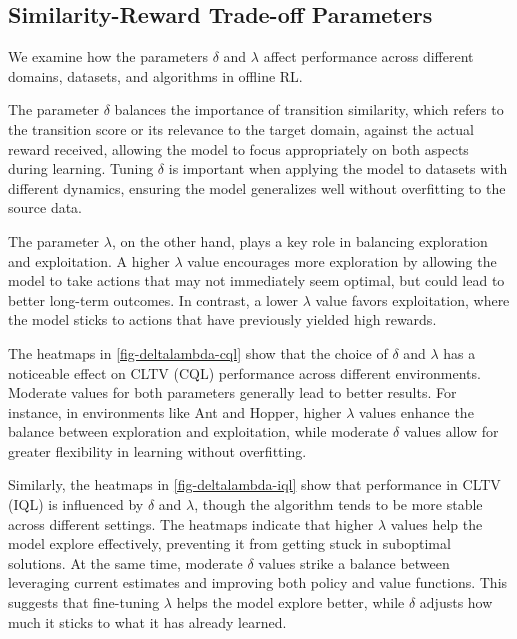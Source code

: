 \subsection{Similarity-Reward Trade-off Parameters}
\label{par-impact}
We examine how the parameters \(\delta\) and \(\lambda\) affect performance across different domains, datasets, and algorithms in offline RL.

The parameter \(\delta\) balances the importance of transition similarity, which refers to the transition score or its relevance to the target domain, against the actual reward received, allowing the model to focus appropriately on both aspects during learning. Tuning \(\delta\) is important when applying the model to datasets with different dynamics, ensuring the model generalizes well without overfitting to the source data. 

The parameter \(\lambda\), on the other hand, plays a key role in balancing exploration and exploitation. A higher \(\lambda\) value encourages more exploration by allowing the model to take actions that may not immediately seem optimal, but could lead to better long-term outcomes. In contrast, a lower \(\lambda\) value favors exploitation, where the model sticks to actions that have previously yielded high rewards.

The heatmaps in \autoref{fig-deltalambda-cql} show that the choice of \(\delta\) and \(\lambda\) has a noticeable effect on CLTV (CQL) performance across different environments. Moderate values for both parameters generally lead to better results. For instance, in environments like Ant and Hopper, higher \(\lambda\) values enhance the balance between exploration and exploitation, while moderate \(\delta\) values allow for greater flexibility in learning without overfitting.

Similarly, the heatmaps in \autoref{fig-deltalambda-iql} show that performance in CLTV (IQL) is influenced by \(\delta\) and \(\lambda\), though the algorithm tends to be more stable across different settings. The heatmaps indicate that higher \(\lambda\) values help the model explore effectively, preventing it from getting stuck in suboptimal solutions. At the same time, moderate \(\delta\) values strike a balance between leveraging current estimates and improving both policy and value functions. This suggests that fine-tuning \(\lambda\) helps the model explore better, while \(\delta\) adjusts how much it sticks to what it has already learned.


